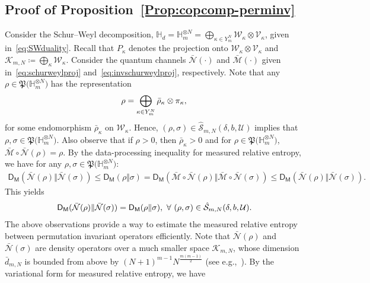 \documentclass[a4paper,onecolumn,11pt,accepted=2026-05-12]{quantumarticle}
\newcommand{\sD}{\mathsf{D}}
\newcommand{\cK}{\mathcal{K}}
\newcommand{\cM}{\mathcal{M}}
\newcommand{\cN}{\mathcal{N}}
\newcommand{\cS}{\mathcal{S}}
\newcommand{\cU}{\mathcal{U}}
\newcommand{\cV}{\mathcal{V}}
\newcommand{\cW}{\mathcal{W}}
\newcommand{\HH}{\mathbb{H}}
\begin{document}
\subsection{Proof of Proposition~\ref{Prop:copcomp-perminv}}\label{Sec:Prop:copcomp-perminv-proof}
Consider the Schur--Weyl decomposition, $\HH_d=\HH_m^{\otimes N}=\bigoplus_{\kappa \in Y_m^N} \cW_{\kappa} \otimes \cV_{\kappa}$,  given in~\eqref{eq:SWduality}. Recall that  $P_{\kappa}$ denotes the projection onto $\cW_{\kappa} \otimes \cV_{\kappa}$ and  $\cK_{m,N}\coloneqq \bigoplus_{\kappa} \cW_{\kappa}$. Consider the  quantum channels $\bar{\cN}(\cdot)$ and $\bar{\cM}(\cdot)$ given in~\eqref{eq:schurweylproj} and~\eqref{eq:invschurweylproj}, respectively. 
 Note that any $\rho \in \mathfrak{P}\big(\HH_m^{\otimes N}\big)$  has the representation 
\begin{align}
    \rho= \bigoplus_{\kappa \in Y_m^N} \bar{\rho}_{\kappa} \otimes \pi_{\kappa}, \notag
\end{align}
for some endomorphism  $\bar{\rho}_{\kappa} $ on $\cW_{\kappa}$. Hence, $(\rho,\sigma) \in \hat{\cS}_{m,N}(\delta, b,\cU)$ implies  that $\rho,\sigma \in \mathfrak{P}\big(\HH_m^{\otimes N}\big)$. Also observe that  if $\rho >0$, then $\bar{\rho}_{\kappa} >0$ and for $\rho \in \mathfrak{P}\big(\HH_m^{\otimes N}\big) $, $\bar{\cM} \circ \bar{\cN} (\rho)=\rho$. By the data-processing inequality for measured relative entropy, we have for any $\rho,\sigma \in \mathfrak{P}\big(\HH_m^{\otimes N}\big) $:
\begin{align}
  \sD_{\mathsf{M}}( \bar{\cN} (\rho)\Vert  \bar{\cN} (\sigma))  \leq \sD_{\mathsf{M}}(\rho\Vert\sigma)= \sD_{\mathsf{M}}(\bar{\cM} \circ \bar{\cN} (\rho)\Vert\bar{\cM} \circ \bar{\cN} (\sigma)) \leq \sD_{\mathsf{M}}( \bar{\cN} (\rho)\Vert  \bar{\cN} (\sigma)).\label{eq:datprocarg}
\end{align}
This yields
\begin{align}
 \sD_{\mathsf{M}}( \bar{\cN} (\rho)\Vert  \bar{\cN} (\sigma))=\sD_{\mathsf{M}}(\rho \Vert  \sigma), ~\forall ~(\rho,\sigma) \in \hat{\cS}_{m,N}(\delta, b,\cU).   \notag
\end{align}
The above observations provide a way to estimate the measured relative entropy between permutation invariant operators efficiently. Note that $\bar{\cN} (\rho)$ and $\bar{\cN} (\sigma)$ are density operators over a much smaller space $\cK_{m,N}$, whose dimension $\bar d_{m,N}$ is bounded from above by $(N+1)^{m-1} N^{\frac{m(m-1)}{2}}$ (see e.g.,~\cite[Equation 6.16]{Hayashi-2017}). By the variational form for measured relative entropy, we have
\end{document}
